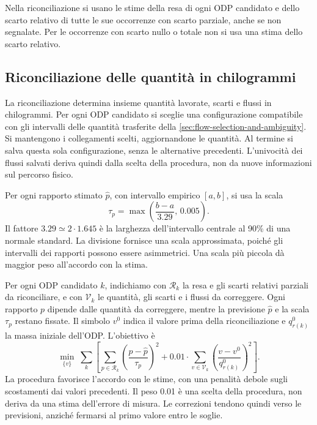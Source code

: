 Nella riconciliazione si usano le stime della resa di ogni ODP candidato e dello scarto relativo di tutte le sue occorrenze con scarto parziale, anche se non segnalate. Per le occorrenze con scarto nullo o totale non si usa una stima dello scarto relativo.

\subsection{Riconciliazione delle quantità in chilogrammi}
\label{sec:mass-constrained-imputation}

La riconciliazione determina insieme quantità lavorate, scarti e flussi in chilogrammi. Per ogni ODP candidato si sceglie una configurazione compatibile con gli intervalli delle quantità trasferite della \cref{sec:flow-selection-and-ambiguity}. Si mantengono i collegamenti scelti, aggiornandone le quantità. Al termine si salva questa sola configurazione, senza le alternative precedenti. L'univocità dei flussi salvati deriva quindi dalla scelta della procedura, non da nuove informazioni sul percorso fisico.

Per ogni rapporto stimato $\widehat{p}$, con intervallo empirico $[a,b]$, si usa la scala
\begin{equation}
\label{eq:mass-imputation-scale}
\tau_p=\max\left(\frac{b-a}{3.29},\,\num{0.005}\right).
\end{equation}
Il fattore $3.29\simeq2\cdot1.645$ è la larghezza dell'intervallo centrale al 90\% di una normale standard. La divisione fornisce una scala approssimata, poiché gli intervalli dei rapporti possono essere asimmetrici. Una scala più piccola dà maggior peso all'accordo con la stima.

Per ogni ODP candidato $k$, indichiamo con $\mathcal{R}_k$ la resa e gli scarti relativi parziali da riconciliare, e con $\mathcal{V}_k$ le quantità, gli scarti e i flussi da correggere. Ogni rapporto $p$ dipende dalle quantità da correggere, mentre la previsione $\widehat{p}$ e la scala $\tau_p$ restano fissate. Il simbolo $v^0$ indica il valore prima della riconciliazione e $q^0_{r(k)}$ la massa iniziale dell'ODP. L'obiettivo è
\begin{equation}
\label{eq:mass-reconciliation-objective}
\min_{\{v\}}\;
\sum_k\left[
\sum_{p\in\mathcal{R}_k}\left(\frac{p-\widehat{p}}{\tau_p}\right)^2
+\num{0.01}\cdot\sum_{v\in\mathcal{V}_k}
\left(\frac{v-v^0}{q^0_{r(k)}}\right)^2
\right].
\end{equation}
La procedura favorisce l'accordo con le stime, con una penalità debole sugli scostamenti dai valori precedenti. Il peso \num{0.01} è una scelta della procedura, non deriva da una stima dell'errore di misura. Le correzioni tendono quindi verso le previsioni, anziché fermarsi al primo valore entro le soglie.

